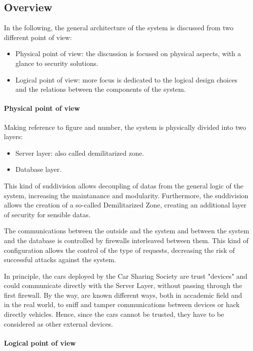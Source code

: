 \subsection{Overview}

In the following, the general architecture of the system is discussed from two different point of view:

	\begin{itemize}
		\item Physical point of view: the discussion is focused on physical aspects, with a glance to security solutions. 
		\item Logical point of view: more focus is dedicated to the logical design choices and the relations between the components of the system. 
	\end{itemize} 


	\paragraph{Physical point of view}
		Making reference to {figure and number}, the system is physically divided into two layers:
		\begin{itemize}
			\item Server layer: also called demilitarized zone.
			\item Database layer.
		\end{itemize}
		This kind of suddivision allows decoupling of datas from the general logic of the system, increasing the maintanance and modularity.
		Furthermore, the suddivision allows the creation of a so-called Demilitarized Zone, creating an additional layer of security for sensible datas.

		The communications between the outside and the system and between the system and the database is controlled by firewalls interleaved between them. This kind of configuration allows the control of the type of requests, decreasing the risk of successful attacks against the system. 

		In principle, the cars deployed by the Car Sharing Society are trust "devices" and could communicate directly with the Server Layer, without passing through the first firewall. By the way, are known different ways, both in accademic field and in the real world, to sniff and tamper communications between devices or hack directly vehicles. Hence, since the cars cannot be trusted, they have to be considered as other external devices. 
	\paragraph{Logical point of view}
